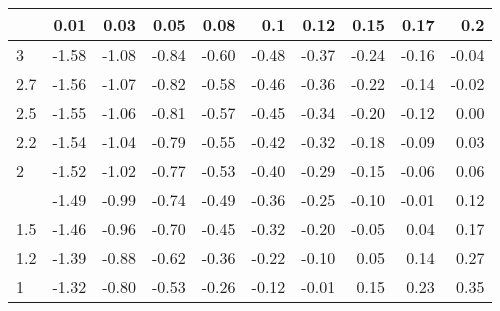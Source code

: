 
\begin{tabular}{lrrrrrrrrr}
\toprule
  & 0.01 & 0.03 & 0.05 & 0.08 & 0.1 & 0.12 & 0.15 & 0.17 & 0.2\\
\midrule
3 & -1.58 & -1.08 & -0.84 & -0.60 & -0.48 & -0.37 & -0.24 & -0.16 & -0.04\\
2.7 & -1.56 & -1.07 & -0.82 & -0.58 & -0.46 & -0.36 & -0.22 & -0.14 & -0.02\\
2.5 & -1.55 & -1.06 & -0.81 & -0.57 & -0.45 & -0.34 & -0.20 & -0.12 & 0.00\\
2.2 & -1.54 & -1.04 & -0.79 & -0.55 & -0.42 & -0.32 & -0.18 & -0.09 & 0.03\\
2 & -1.52 & -1.02 & -0.77 & -0.53 & -0.40 & -0.29 & -0.15 & -0.06 & 0.06\\
\addlinespace
1.7 & -1.49 & -0.99 & -0.74 & -0.49 & -0.36 & -0.25 & -0.10 & -0.01 & 0.12\\
1.5 & -1.46 & -0.96 & -0.70 & -0.45 & -0.32 & -0.20 & -0.05 & 0.04 & 0.17\\
1.2 & -1.39 & -0.88 & -0.62 & -0.36 & -0.22 & -0.10 & 0.05 & 0.14 & 0.27\\
1 & -1.32 & -0.80 & -0.53 & -0.26 & -0.12 & -0.01 & 0.15 & 0.23 & 0.35\\
\bottomrule
\end{tabular}
